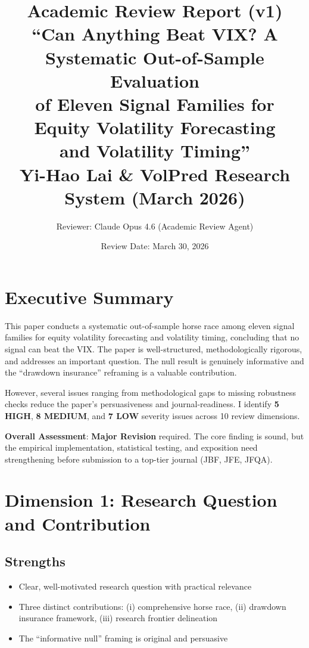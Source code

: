 \documentclass[12pt,a4paper]{article}
\title{Academic Review Report (v1)\\
\large ``Can Anything Beat VIX? A Systematic Out-of-Sample Evaluation\\of Eleven Signal Families for Equity Volatility Forecasting\\and Volatility Timing''\\[6pt]
\normalsize Yi-Hao Lai \& VolPred Research System (March 2026)}
\author{Reviewer: Claude Opus 4.6 (Academic Review Agent)}
\date{Review Date: March 30, 2026}
\begin{document}
\maketitle
\tableofcontents
\newpage

\section{Executive Summary}

This paper conducts a systematic out-of-sample horse race among eleven signal families for equity volatility forecasting and volatility timing, concluding that no signal can beat the VIX. The paper is well-structured, methodologically rigorous, and addresses an important question. The null result is genuinely informative and the ``drawdown insurance'' reframing is a valuable contribution.

However, several issues ranging from methodological gaps to missing robustness checks reduce the paper's persuasiveness and journal-readiness. I identify \textbf{5 HIGH}, \textbf{8 MEDIUM}, and \textbf{7 LOW} severity issues across 10 review dimensions.

\medskip
\noindent\textbf{Overall Assessment}: \textbf{Major Revision} required. The core finding is sound, but the empirical implementation, statistical testing, and exposition need strengthening before submission to a top-tier journal (JBF, JFE, JFQA).

\section{Dimension 1: Research Question and Contribution}
\label{sec:d1}

\subsection*{Strengths}
\begin{itemize}
    \item Clear, well-motivated research question with practical relevance
    \item Three distinct contributions: (i) comprehensive horse race, (ii) drawdown insurance framework, (iii) research frontier delineation
    \item The ``informative null'' framing is original and persuasive
\end{itemize}
\end{document}
